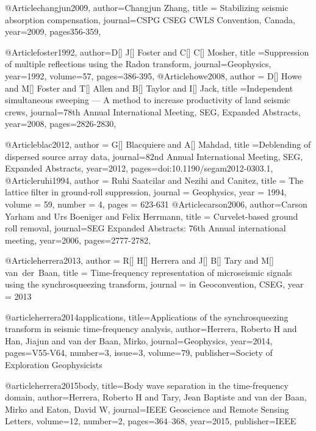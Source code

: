 @Article{changjun2009,
  author={Changjun Zhang},
  title = {Stabilizing seismic absorption compensation},
  journal={CSPG CSEG CWLS Convention, Canada},
  year=2009,
  pages{356-359},
}



@Article{foster1992,
  author={D[] J[] Foster and C[] C[] Mosher},
  title ={Suppression of multiple reflections using the Radon transform},
  journal={Geophysics},
  year=1992,
  volume=57,
  pages={386-395},
}
@Article{howe2008,
  author = {D[] Howe and M[] Foster and T[] Allen and B[] Taylor and I[] Jack},
  title ={Independent simultaneous sweeping — A
method to increase productivity of land seismic crews},
  journal={78th Annual International Meeting, SEG,
Expanded Abstracts},
  year=2008,
  pages={2826-2830},
}

@Article{blac2012,
  author = {G[] Blacquiere and A[] Mahdad},
  title ={Deblending of dispersed source array data},
  journal={82nd Annual International Meeting, SEG, Expanded Abstracts},
  year=2012,
  pages={doi:10.1190/segam2012-0303.1},
}
@Article{ruhi1994,
  author = 	 {Ruhi Saatcilar and Nezihi and Canitez},
  title = 	 {The lattice filter in ground-roll suppression},
  journal = 	 {Geophysics},
  year = 	 1994,
  volume = 	 59,
  number = 	 4,
  pages = 	 {623-631}}
@Article{carson2006,
  author={Carson Yarham and Urs Boeniger and Felix Herrmann},
  title = {Curvelet-based ground roll removal},
  journal={SEG Expanded Abstracts: 76th Annual international meeting},
  year=2006,
  pages={2777-2782},
}

@Article{herrera2013,
  author = 	 {R[] H[] Herrera and J[] B[] Tary and M[] van~der~Baan},
  title = 	 {Time-frequency representation of microseismic signals using the synchrosqueezing transform},
  journal = 	 {in Geoconvention, CSEG},
  year = 	 2013
}

@article{herrera2014applications,
  title={Applications of the synchrosqueezing transform in seismic time-frequency analysis},
  author={Herrera, Roberto H and Han, Jiajun and van der Baan, Mirko},
  journal={Geophysics},
  year={2014},
  pages={V55-V64},
  number=3,
  issue=3,
  volume=79,
  publisher={Society of Exploration Geophysicists}
}

@article{herrera2015body,
  title={Body wave separation in the time-frequency domain},
  author={Herrera, Roberto H and Tary, Jean Baptiste and van der Baan, Mirko and Eaton, David W},
  journal={IEEE Geoscience and Remote Sensing Letters},
  volume={12},
  number={2},
  pages={364--368},
  year={2015},
  publisher={IEEE}
}

